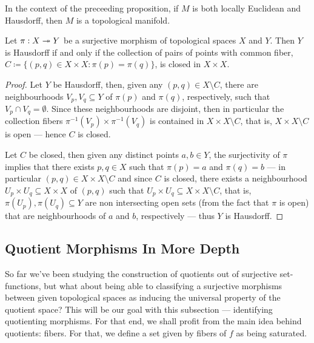 \begin{corollary}
\label{cor:manifold-from-quotient}
In the context of the preceeding proposition, if \(M\) is both locally Euclidean
and Hausdorff, then \(M\) is a topological manifold.
\end{corollary}

\begin{proposition}
\label{prop:open-quotient-hausdorff}
Let \(\pi: X \twoheadrightarrow Y\) be a surjective morphism of topological spaces \(X\) and
\(Y\). Then \(Y\) is Hausdorff if and only if the collection of pairs of points
with common fiber, \(C \coloneqq \{(p, q) \in X \times X : \pi(p) = \pi(q)\}\),
is closed in \(X \times X\).
\end{proposition}

\begin{proof}
Let \(Y\) be Hausdorff, then, given any \((p, q) \in X \setminus C\), there are
neighbourhoods \(V_p, V_q \subseteq Y\) of \(\pi(p)\) and \(\pi(q)\),
respectively, such that \(V_p \cap V_q = \emptyset\). Since these neighbourhoods
are disjoint, then in particular the collection fibers \(\pi^{-1}(V_p) \times
\pi^{-1}(V_q)\) is contained in \(X \times X \setminus C\), that is, \(X \times
X \setminus C\) is open --- hence \(C\) is closed.

Let \(C\) be closed, then given any distinct points \(a, b \in Y\), the
surjectivity of \(\pi\) implies that there exists \(p, q \in X\) such that
\(\pi(p) = a\) and \(\pi(q) = b\) --- in particular \((p, q) \in X \times X
\setminus C\) and since \(C\) is closed, there exists a neighbourhood \(U_p
\times U_q \subseteq X \times X\) of \((p, q)\) such that \(U_p \times U_q
\subseteq X \times X \setminus C\), that is, \(\pi(U_p), \pi(U_q) \subseteq Y\)
are non intersecting open sets (from the fact that \(\pi\) is open) that are
neighbourhoods of \(a\) and \(b\), respectively --- thus \(Y\) is Hausdorff.
\end{proof}

\subsection{Quotient Morphisms In More Depth}

So far we've been studying the construction of quotients out of surjective
set-functions, but what about being able to classifying a surjective morphisms
between given topological spaces as inducing the universal property of the
quotient space? This will be our goal with this subsection --- identifying
quotienting morphisms. For that end, we shall profit from the main idea behind
quotients: fibers. For that, we define a set given by fibers of \(f\) as being
saturated.

